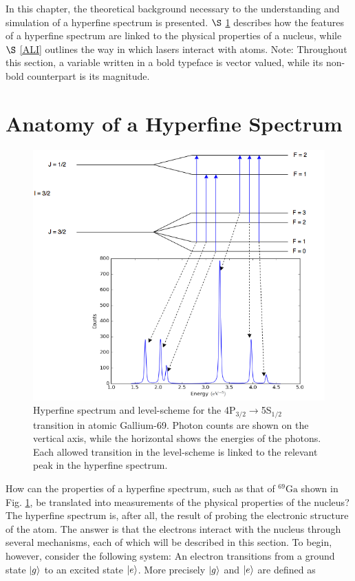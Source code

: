 \noindent In this chapter, the theoretical background necessary to the understanding and simulation of a hyperfine spectrum is presented. $\S$ \ref{AHF} describes how the features of a hyperfine spectrum are linked to the physical properties of a nucleus, while $\S$ \ref{ALI} outlines the way in which lasers interact with atoms.
Note: Throughout this section, a variable written in a bold typeface is vector valued, while its non-bold counterpart is its magnitude. 
\section{Anatomy of a Hyperfine Spectrum}
\label{AHF}
\begin{figure}[h]
\includegraphics[width=\textwidth]{Graphics/spec_with_peaks_4.png}
\caption[Hyperfine spectrum and level-scheme for Gallium-69.]{Hyperfine spectrum and level-scheme for the 4P$_{3/2}\rightarrow$5S$_{1/2}$ transition in atomic Gallium-69. Photon counts are shown on the vertical axis, while the horizontal shows the energies of the photons. Each allowed transition in the level-scheme is linked to the relevant peak in the hyperfine spectrum.}
\label{ga69}
\end{figure}
How can the properties of a hyperfine spectrum, such as that of $^{69}\mathrm{Ga}$ shown in Fig. \ref{ga69}, be translated into measurements of the physical properties of the nucleus? The hyperfine spectrum is, after all, the result of probing the electronic structure of the atom. The answer is that the electrons interact with the nucleus through several mechanisms, each of which will be described in this section. To begin, however, consider the following system: An electron transitions from a ground state $\ket{g}$ to an excited state $\ket{e}$. More precisely $\ket{g}$ and $\ket{e}$ are defined as 
